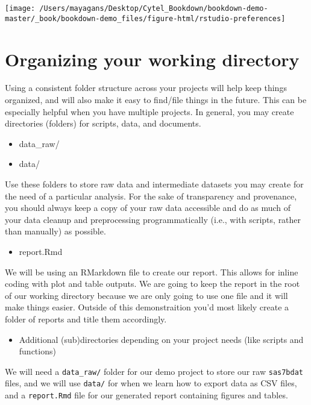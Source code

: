 \documentclass[]{book}
\providecommand{\tightlist}{%
  \setlength{\itemsep}{0pt}\setlength{\parskip}{0pt}}
\begin{document}
\begin{center}\texttt{[image: /Users/mayagans/Desktop/Cytel\_Bookdown/bookdown-demo-master/\_book/bookdown-demo\_files/figure-html/rstudio-preferences]} \end{center}

\section{Organizing your working
directory}\label{organizing-your-working-directory}

Using a consistent folder structure across your projects will help keep
things organized, and will also make it easy to find/file things in the
future. This can be especially helpful when you have multiple projects.
In general, you may create directories (folders) for scripts, data, and
documents.

\begin{itemize}
\tightlist
\item
  data\_raw/
\item
  data/
\end{itemize}

Use these folders to store raw data and intermediate datasets you may
create for the need of a particular analysis. For the sake of
transparency and provenance, you should always keep a copy of your raw
data accessible and do as much of your data cleanup and preprocessing
programmatically (i.e., with scripts, rather than manually) as possible.

\begin{itemize}
\tightlist
\item
  report.Rmd
\end{itemize}

We will be using an RMarkdown file to create our report. This allows for
inline coding with plot and table outputs. We are going to keep the
report in the root of our working directory because we are only going to
use one file and it will make things easier. Outside of this
demonstraition you'd most likely create a folder of reports and title
them accordingly.

\begin{itemize}
\tightlist
\item
  Additional (sub)directories depending on your project needs (like
  scripts and functions)
\end{itemize}

We will need a \texttt{data\_raw/} folder for our demo project to store
our raw \texttt{sas7bdat} files, and we will use \texttt{data/} for when
we learn how to export data as CSV files, and a \texttt{report.Rmd} file
for our generated report containing figures and tables.
\end{document}

